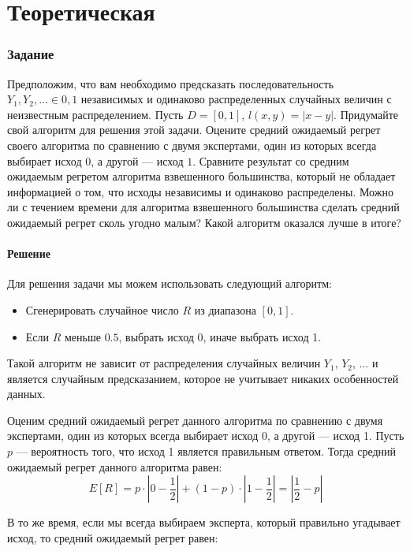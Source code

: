 \documentclass[a4paper,14pt]{extarticle}
\begin{document}
\newpage

\part{Теоретическая}
\section{Задание }

Предположим, что вам необходимо предсказать последовательность $Y_1, Y_2, \ldots \in {0, 1}$ независимых и одинаково распределенных случайных величин с неизвестным распределением. Пусть $D = [0, 1]$, $l(x, y) = |x - y|$. Придумайте свой алгоритм для решения этой задачи. Оцените средний ожидаемый регрет своего алгоритма по сравнению с двумя экспертами, один из которых всегда выбирает исход $0$, а другой — исход $1$. Сравните результат со средним ожидаемым регретом алгоритма взвешенного большинства, который не обладает информацией о том, что исходы независимы и одинаково распределены. Можно ли с течением времени для алгоритма взвешенного большинства сделать средний ожидаемый регрет сколь угодно малым? Какой алгоритм оказался лучше в итоге?

\subsection{Решение}

Для решения задачи мы можем использовать следующий алгоритм:
\begin{itemize}
\item Сгенерировать случайное число $R$ из диапазона $[0,1]$.
\item Если $R$ меньше $0.5$, выбрать исход 0, иначе выбрать исход 1.
\end{itemize}

Такой алгоритм не зависит от распределения случайных величин $Y_1$, $Y_2$, ... и является случайным предсказанием, которое не учитывает никаких особенностей данных.

Оценим средний ожидаемый регрет данного алгоритма по сравнению с двумя экспертами, один из которых всегда выбирает исход 0, а другой — исход 1. Пусть $p$ — вероятность того, что исход 1 является правильным ответом. Тогда средний ожидаемый регрет данного алгоритма равен:
$$ E\left[R\right] = p \cdot \left|0 - \frac{1}{2}\right| + \left(1 - p\right) \cdot \left|1 - \frac{1}{2}\right| = \left|\frac{1}{2} - p\right| $$

В то же время, если мы всегда выбираем эксперта, который правильно угадывает исход, то средний ожидаемый регрет равен:
\end{document}

